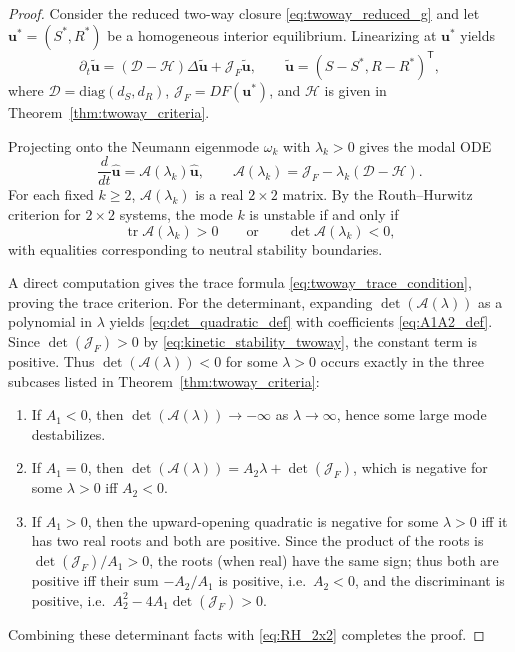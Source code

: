 \documentclass[10pt,a4paper]{amsart}
\begin{document}
\begin{proof}
Consider the reduced two-way closure \eqref{eq:twoway_reduced_g} and let $\mathbf{u}^*=(S^*,R^*)$ be a homogeneous interior equilibrium.
Linearizing at $\mathbf{u}^*$ yields
\[
\partial_t \tilde{\mathbf{u}}=(\mathcal{D}-\mathcal{H})\Delta \tilde{\mathbf{u}}+\mathcal{J}_F\tilde{\mathbf{u}},
\qquad
\tilde{\mathbf{u}}=(S-S^*,R-R^*)^{\mathsf T},
\]
where $\mathcal{D}=\mathrm{diag}(d_S,d_R)$, $\mathcal{J}_F=DF(\mathbf{u}^*)$, and $\mathcal{H}$ is given in Theorem~\ref{thm:twoway_criteria}.

Projecting onto the Neumann eigenmode $\omega_k$ with $\lambda_k>0$ gives the modal ODE
\[
\frac{d}{dt}\hat{\mathbf{u}}=\mathcal{A}(\lambda_k)\hat{\mathbf{u}},
\qquad
\mathcal{A}(\lambda_k)=\mathcal{J}_F-\lambda_k(\mathcal{D}-\mathcal{H}).
\]
For each fixed $k\ge2$, $\mathcal{A}(\lambda_k)$ is a real $2\times2$ matrix.
By the Routh--Hurwitz criterion for $2\times2$ systems, the mode $k$ is unstable if and only if
\begin{equation}
\label{eq:RH_2x2}
\operatorname{tr}\mathcal{A}(\lambda_k)>0
\qquad \text{or}\qquad
\det\mathcal{A}(\lambda_k)<0,
\end{equation}
with equalities corresponding to neutral stability boundaries.

A direct computation gives the trace formula \eqref{eq:twoway_trace_condition}, proving the trace criterion.
For the determinant, expanding $\det(\mathcal{A}(\lambda))$ as a polynomial in $\lambda$ yields \eqref{eq:det_quadratic_def}
with coefficients \eqref{eq:A1A2_def}. Since $\det(\mathcal{J}_F)>0$ by \eqref{eq:kinetic_stability_twoway}, the constant term is positive.
Thus $\det(\mathcal{A}(\lambda))<0$ for some $\lambda>0$ occurs exactly in the three subcases listed in Theorem~\ref{thm:twoway_criteria}:
\begin{enumerate}[label=(\roman*)]
\item If $A_1<0$, then $\det(\mathcal{A}(\lambda))\to -\infty$ as $\lambda\to\infty$, hence some large mode destabilizes.
\item If $A_1=0$, then $\det(\mathcal{A}(\lambda))=A_2\lambda+\det(\mathcal{J}_F)$, which is negative for some $\lambda>0$ iff $A_2<0$.
\item If $A_1>0$, then the upward-opening quadratic is negative for some $\lambda>0$ iff it has two real roots and both are positive.
Since the product of the roots is $\det(\mathcal{J}_F)/A_1>0$, the roots (when real) have the same sign; thus both are positive iff
their sum $-A_2/A_1$ is positive, i.e.\ $A_2<0$, and the discriminant is positive, i.e.\ $A_2^2-4A_1\det(\mathcal{J}_F)>0$.
\end{enumerate}
Combining these determinant facts with \eqref{eq:RH_2x2} completes the proof.
\end{proof}
\end{document}

